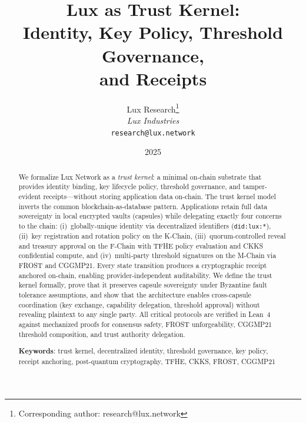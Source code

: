\documentclass[11pt,a4paper]{article}
\title{\textbf{Lux as Trust Kernel:\\Identity, Key Policy, Threshold Governance,\\and Receipts}}
\author{
Lux Research\thanks{Corresponding author: research@lux.network}\\
\textit{Lux Industries}\\
\texttt{research@lux.network}
}
\date{2025}
\begin{document}
\luxcoverpage

\begin{abstract}
We formalize Lux Network as a \emph{trust kernel}: a minimal on-chain substrate that
provides identity binding, key lifecycle policy, threshold governance, and tamper-evident
receipts---without storing application data on-chain. The trust kernel model inverts the
common blockchain-as-database pattern. Applications retain full data sovereignty in local
encrypted vaults (capsules) while delegating exactly four concerns to the chain:
(i)~globally-unique identity via decentralized identifiers (\texttt{did:lux:*}),
(ii)~key registration and rotation policy on the K-Chain,
(iii)~quorum-controlled reveal and treasury approval on the F-Chain with TFHE policy
evaluation and CKKS confidential compute,
and (iv)~multi-party threshold signatures on the M-Chain via FROST and CGGMP21.
Every state transition produces a cryptographic receipt anchored on-chain, enabling
provider-independent auditability. We define the trust kernel formally, prove that it
preserves capsule sovereignty under Byzantine fault tolerance assumptions, and show
that the architecture enables cross-capsule coordination (key exchange, capability
delegation, threshold approval) without revealing plaintext to any single party.
All critical protocols are verified in Lean~4 against mechanized proofs for
consensus safety, FROST unforgeability, CGGMP21 threshold composition, and
trust authority delegation.

\textbf{Keywords}: trust kernel, decentralized identity, threshold governance,
key policy, receipt anchoring, post-quantum cryptography, TFHE, CKKS, FROST, CGGMP21
\end{abstract}

\tableofcontents
\newpage














\end{document}
